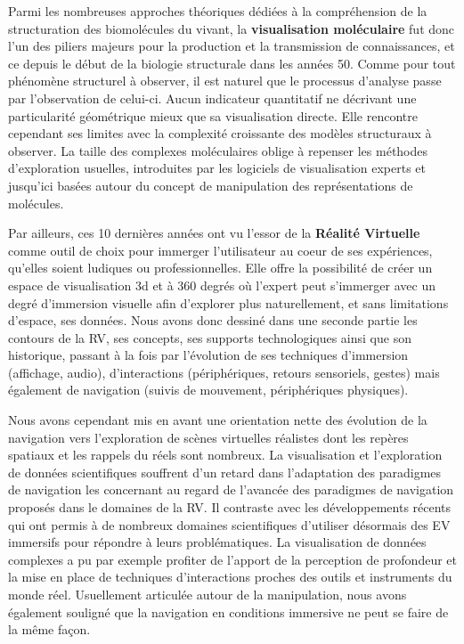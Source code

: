 Parmi les nombreuses approches théoriques dédiées à la compréhension de la structuration des biomolécules du vivant, la \textbf{visualisation moléculaire} fut donc l'un des piliers majeurs pour la production et la transmission de connaissances, et ce depuis le début de la biologie structurale dans les années 50. Comme pour tout phénomène structurel à observer, il est naturel que le processus d'analyse passe par l'observation de celui-ci. Aucun indicateur quantitatif ne décrivant une particularité géométrique mieux que sa visualisation directe. Elle rencontre cependant ses limites avec la complexité croissante des modèles structuraux à observer. La taille des complexes moléculaires oblige à repenser les méthodes d'exploration usuelles, introduites par les logiciels de visualisation experts et jusqu'ici basées autour du concept de manipulation des représentations de molécules.



Par ailleurs, ces 10 dernières années ont vu l'essor de la \textbf{Réalité Virtuelle} comme outil de choix pour immerger l'utilisateur au coeur de ses expériences, qu'elles soient ludiques ou professionnelles. Elle offre la possibilité de créer un espace de visualisation 3d et à 360 degrés où l'expert peut s'immerger avec un degré d'immersion visuelle afin d'explorer plus naturellement, et sans limitations d'espace, ses données. Nous avons donc dessiné dans une seconde partie les contours de la RV, ses concepts, ses supports technologiques ainsi que son historique, passant à la fois par l'évolution de ses techniques d'immersion (affichage, audio), d'interactions (périphériques, retours sensoriels, gestes) mais également de navigation (suivis de mouvement, périphériques physiques). 

Nous avons cependant mis en avant une orientation nette des évolution de la navigation vers l'exploration de scènes virtuelles réalistes dont les repères spatiaux et les rappels du réels sont nombreux. La visualisation et l'exploration de données scientifiques souffrent d'un retard dans l'adaptation des paradigmes de navigation les concernant au regard de l'avancée des paradigmes de navigation proposés dans le domaines de la RV.
Il contraste avec les développements récents qui ont permis à de nombreux domaines scientifiques d'utiliser désormais des EV immersifs pour répondre à leurs problématiques. La visualisation de données complexes a pu par exemple profiter de l'apport de la perception de profondeur et la mise en place de techniques d'interactions proches des outils et instruments du monde réel. Usuellement articulée autour de la manipulation, nous avons également souligné que la navigation en conditions immersive ne peut se faire de la même façon. 


